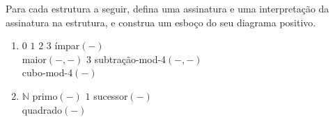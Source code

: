 \begin{exercises}
    \begin{question}
        Para cada estrutura a seguir, defina uma assinatura e uma interpretação da assinatura na estrutura, e construa um esboço do seu diagrama positivo.
        \begin{enumerate}
            \item 
                \begin{structure}
                    {}
                    {$0$ $1$ $2$ $3$}
                    {ímpar$(-)$\\maior$(-, -)$}
                    {$3$}
                    {subtração-mod-4$(-, -)$\\cubo-mod-4$(-)$}
                \end{structure}
            \item
                \begin{structure}
                    {$\mathbb{N}$}
                    {}
                    {primo$(-)$}
                    {$1$}
                    {sucessor$(-)$\\quadrado$(-)$}
                \end{structure}
        \end{enumerate}
    \end{question}
\end{exercises}